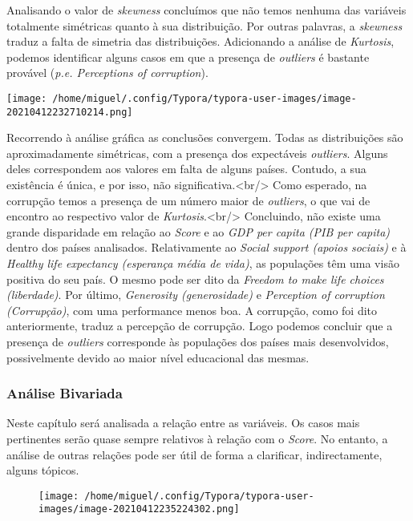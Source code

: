 \documentclass[]{article}
\begin{document}
Analisando o valor de \emph{skewness} concluímos que não temos nenhuma
das variáveis totalmente simétricas quanto à sua distribuição. Por
outras palavras, a \emph{skewness} traduz a falta de simetria das
distribuições. Adicionando a análise de \emph{Kurtosis}, podemos
identificar alguns casos em que a presença de \emph{outliers} é bastante
provável (\emph{p.e. Perceptions of corruption}).

\texttt{[image: /home/miguel/.config/Typora/typora-user-images/image-20210412232710214.png]}

Recorrendo à análise gráfica as conclusões convergem. Todas as
distribuições são aproximadamente simétricas, com a presença dos
expectáveis \emph{outliers}. Alguns deles correspondem aos valores em
falta de alguns países. Contudo, a sua existência é única, e por isso,
não significativa.\textless{}br/\textgreater{} Como esperado, na
corrupção temos a presença de um número maior de \emph{outliers}, o que
vai de encontro ao respectivo valor de
\emph{Kurtosis}.\textless{}br/\textgreater{} Concluindo, não existe uma
grande disparidade em relação ao \emph{Score} e ao \emph{GDP per capita
(PIB per capita)} dentro dos países analisados. Relativamente ao
\emph{Social support (apoios sociais)} e à \emph{Healthy life expectancy
(esperança média de vida)}, as populações têm uma visão positiva do seu
país. O mesmo pode ser dito da \emph{Freedom to make life choices
(liberdade)}. Por último, \emph{Generosity (generosidade)} e
\emph{Perception of corruption (Corrupção)}, com uma performance menos
boa. A corrupção, como foi dito anteriormente, traduz a percepção de
corrupção. Logo podemos concluir que a presença de \emph{outliers}
corresponde às populações dos países mais desenvolvidos, possivelmente
devido ao maior nível educacional das mesmas.

\hypertarget{header-n148}{%
\subsubsection{Análise Bivariada}\label{header-n148}}

Neste capítulo será analisada a relação entre as variáveis. Os casos
mais pertinentes serão quase sempre relativos à relação com o
\emph{Score}. No entanto, a análise de outras relações pode ser útil de
forma a clarificar, indirectamente, alguns tópicos.

\begin{figure}
\centering
\texttt{[image: /home/miguel/.config/Typora/typora-user-images/image-20210412235224302.png]}
\caption{}
\end{figure}
\end{document}
